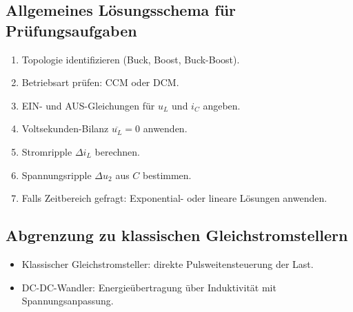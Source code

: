 \subsection{Allgemeines Lösungsschema für Prüfungsaufgaben}

\begin{enumerate}
    \item Topologie identifizieren (Buck, Boost, Buck-Boost).
    \item Betriebsart prüfen: CCM oder DCM.
    \item EIN- und AUS-Gleichungen für $u_L$ und $i_C$ angeben.
    \item Voltsekunden-Bilanz $\overline{u_L}=0$ anwenden.
    \item Stromripple $\Delta i_L$ berechnen.
    \item Spannungsripple $\Delta u_2$ aus $C$ bestimmen.
    \item Falls Zeitbereich gefragt: Exponential- oder lineare Lösungen anwenden.
\end{enumerate}

\subsection{Abgrenzung zu klassischen Gleichstromstellern}

\begin{itemize}
    \item Klassischer Gleichstromsteller: direkte Pulsweitensteuerung der Last.
    \item DC-DC-Wandler: Energieübertragung über Induktivität mit Spannungsanpassung.
\end{itemize}

